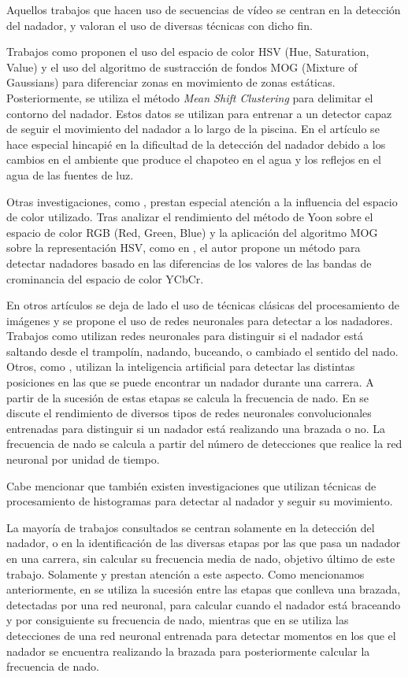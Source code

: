 Aquellos trabajos que hacen uso de secuencias de vídeo se centran en la detección del nadador, y valoran el uso de diversas técnicas con dicho fin.

Trabajos como \cite{swimmerarti} proponen el uso del espacio de color HSV (Hue, Saturation, Value) y el uso del algoritmo de sustracción de fondos MOG (Mixture of Gaussians) para diferenciar zonas en movimiento de zonas estáticas. Posteriormente, se utiliza el método \textit{Mean Shift Clustering} para delimitar el contorno del nadador. Estos datos se utilizan para entrenar a un detector capaz de seguir el movimiento del nadador a lo largo de la piscina. En el artículo se hace especial hincapié en la dificultad de la detección del nadador debido a los cambios en el ambiente que produce el chapoteo en el agua y los reflejos en el agua de las fuentes de luz.

Otras investigaciones, como \cite{swimmerartii}, prestan especial atención a la influencia del espacio de color utilizado. Tras analizar el rendimiento del método de Yoon \cite{yoonmethod} sobre el espacio de color RGB (Red, Green, Blue) y la aplicación del algoritmo MOG sobre la representación HSV, como en \cite{swimmerarti}, el autor propone un método para detectar nadadores basado en las diferencias de los valores de las bandas de crominancia del espacio de color YCbCr.

En otros artículos se deja de lado el uso de técnicas clásicas del procesamiento de imágenes y se propone el uso de redes neuronales para detectar a los nadadores. Trabajos como \cite{swimmerartiv} utilizan redes neuronales para distinguir si el nadador está saltando desde el trampolín, nadando, buceando, o cambiado el sentido del nado. Otros, como \cite{swimmerartvi}, utilizan la inteligencia artificial para detectar las distintas posiciones en las que se puede encontrar un nadador durante una carrera. A partir de la sucesión de estas etapas se calcula la frecuencia de nado. En \cite{swimmerartiii} se discute el rendimiento de diversos tipos de redes neuronales convolucionales entrenadas para distinguir si un nadador está realizando una brazada o no. La frecuencia de nado se calcula a partir del número de detecciones que realice la red neuronal por unidad de tiempo. 

Cabe mencionar que también existen investigaciones \cite{swimmerartv} que utilizan técnicas de procesamiento de histogramas para detectar al nadador y seguir su movimiento.

La mayoría de trabajos consultados se centran solamente en la detección del nadador, o en la identificación de las diversas etapas por las que pasa un nadador en una carrera, sin calcular su frecuencia media de nado, objetivo último de este trabajo. Solamente \cite{swimmerartiii} y \cite{swimmerartvi} prestan atención a este aspecto. Como mencionamos anteriormente, en \cite{swimmerartvi} se utiliza la sucesión entre las etapas que conlleva una brazada, detectadas por una red neuronal, para calcular cuando el nadador está braceando y por consiguiente su frecuencia de nado, mientras que en \cite{swimmerartiii} se utiliza las detecciones de una red neuronal entrenada para detectar momentos en los que el nadador se encuentra realizando la brazada para posteriormente calcular la frecuencia de nado.

